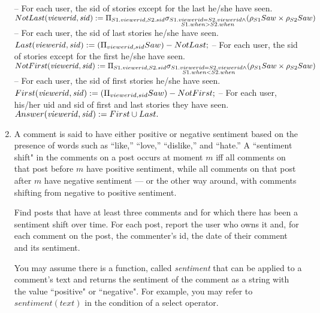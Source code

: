 \documentclass{article}
\newcommand{\var}[1]{\mathit{#1}}
\begin{document}
\begin{enumerate}
{\large
-- For each user, the sid of stories except for the last he/she have seen. \\[5pt]
$
NotLast(\var{viewerid, sid}) :=
	\Pi_{S1.viewerid, S2.sid}
	\sigma_{\substack{S1.viewerid = S2.viewerid \wedge \\ S1.when > S2.when}}
	(\rho_{S1} Saw \times \rho_{S2} Saw) \\[10pt]
$
-- For each user, the sid of last stories he/she have seen. \\[5pt]
$
Last(\var{viewerid, sid}) := 
	(\Pi_{viewerid, sid} Saw) - NotLast; \\[10pt]
$
-- For each user, the sid of stories except for the first he/she have seen. \\[5pt]
$
NotFirst(\var{viewerid, sid}) :=
	\Pi_{S1.viewerid, S2.sid}
	\sigma_{\substack{S1.viewerid = S2.viewerid \wedge \\ S1.when < S2.when}}
	(\rho_{S1} Saw \times \rho_{S2} Saw) \\[10pt]
$
-- For each user, the sid of first stories he/she have seen. \\[5pt]
$
First(\var{viewerid, sid}) := 
	(\Pi_{viewerid, sid} Saw) - NotFirst; \\[10pt]
$
-- For each user, his/her uid and sid of first and last stories they have seen. \\[5pt]
$
Answer(\var{viewerid, sid}) := 
	First \cup Last. \\[10pt]	
$
}

\item   %
A comment is said to have either positive or negative sentiment
based on the presence of words such as ``like,'' ``love,'' ``dislike,'' and ``hate.'' 
A ``sentiment shift" in the comments on a post occurs at moment $m$ iff
all comments on that post before $m$ have positive sentiment, 
while all comments on that post after $m$ have negative sentiment ---
or the other way around, with comments shifting from negative to positive sentiment.

Find posts that have at least three comments and for which there has been a sentiment shift over time. 
For each post, report the user who owns it and,
for each comment on the post,
the commenter's id, 
the date of their comment and its sentiment.

You may assume there is a function, called {\it sentiment}
that can be applied to a comment's text and 
returns the sentiment of the comment as a string with the value ``positive" or ``negative".
For example,
you may refer to $sentiment(text)$ in the condition of a select operator.\\


\end{enumerate}
\end{document}
